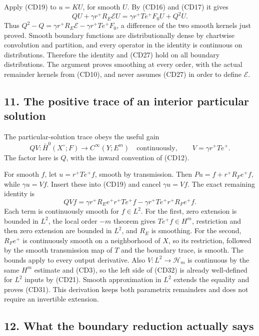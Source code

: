 \documentclass[
  11pt,
]{article}
\begin{document}
Apply (CD19) to \(u=KU\), for smooth \(U\). By (CD16) and (CD17) it
gives \[
QU+\gamma r^+R_E\mathcal E U
=\gamma r^+Te^+F_0U+Q^2U.
\tag{CD30}
\] Thus \(Q^2-Q=\gamma r^+R_E\mathcal E-\gamma r^+Te^+F_0\), a
difference of the two smooth kernels just proved. Smooth boundary
functions are distributionally dense by chartwise convolution and
partition, and every operator in the identity is continuous on
distributions. Therefore the identity and (CD27) hold on all boundary
distributions. The argument proves smoothing at every order, with the
actual remainder kernels from (CD10), and never assumes (CD27) in order
to define \(\mathcal E\).

\subsection{11. The positive trace of an interior particular
solution}\label{the-positive-trace-of-an-interior-particular-solution}

The particular-solution trace obeys the useful gain \[
QV:\bar H^0(X^\circ;F)\longrightarrow C^\infty(Y;E^m)
\quad\text{continuously},\qquad V=\gamma r^+Te^+.
\tag{CD31}
\] The factor here is \(Q\), with the inward convention of (CD12).

For smooth \(f\), let \(u=r^+Te^+f\), smooth by transmission. Then
\(Pu=f+r^+R_Fe^+f\), while \(\gamma u=Vf\). Insert these into (CD19) and
cancel \(\gamma u=Vf\). The exact remaining identity is \[
QVf=\gamma r^+R_Ee^+r^+Te^+f
-\gamma r^+Te^+r^+R_Fe^+f.
\tag{CD32}
\] Each term is continuously smooth for \(f\in L^2\). For the first,
zero extension is bounded in \(L^2\), the local order \(-m\) theorem
gives \(Te^+f\in H^m\), restriction and then zero extension are bounded
in \(L^2\), and \(R_E\) is smoothing. For the second, \(R_F e^+\) is
continuously smooth on a neighborhood of \(X\), so its restriction,
followed by the smooth transmission map of \(T\) and the boundary trace,
is smooth. The bounds apply to every output derivative. Also
\(V:L^2\to\mathcal H_m\) is continuous by the same \(H^m\) estimate and
(CD3), so the left side of (CD32) is already well-defined for \(L^2\)
inputs by (CD21). Smooth approximation in \(L^2\) extends the equality
and proves (CD31). This derivation keeps both parametrix remainders and
does not require an invertible extension.

\subsection{12. What the boundary reduction actually
says}\label{what-the-boundary-reduction-actually-says}
\end{document}

